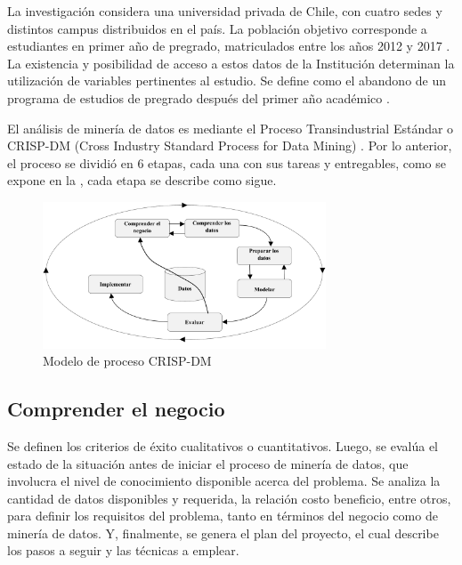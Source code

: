 \documentclass[portuguese]{textolivre}
\begin{document}
La investigación considera una universidad privada de Chile, con cuatro sedes y distintos campus distribuidos en el país. La población objetivo corresponde a estudiantes en primer año de pregrado, matriculados entre los años 2012 y 2017 \cite{Vargas2019}. La existencia y posibilidad de acceso a estos datos de la Institución determinan la utilización de variables pertinentes al estudio. Se define como el abandono de un programa de estudios de pregrado después del primer año académico \cite{ServiciodeInformaciondeEducacionSuperiorSIES2020}.

El análisis de minería de datos es mediante el Proceso Transindustrial Estándar o CRISP-DM (Cross Industry Standard Process for Data Mining) \cite{Chapman1999}. Por lo anterior, el proceso se dividió en 6 etapas, cada una con sus tareas y entregables, como se expone en la , cada etapa se describe como sigue.

\begin{figure}[htbp]
 \centering
 \includegraphics[width=0.75\textwidth]{images/fig-001.pdf}
 \caption{Modelo de proceso CRISP-DM }
 \label{Figura 1}
\end{figure}

\subsection{Comprender el negocio}\label{sec-conduta}

Se definen los criterios de éxito cualitativos o cuantitativos. Luego, se evalúa el estado de la situación antes de iniciar el proceso de minería de datos, que involucra el nivel de conocimiento disponible acerca del problema. Se analiza la cantidad de datos disponibles y requerida, la relación costo beneficio, entre otros, para definir los requisitos del problema, tanto en términos del negocio como de minería de datos. Y, finalmente, se genera el plan del proyecto, el cual describe los pasos a seguir y las técnicas a emplear.
\end{document}
